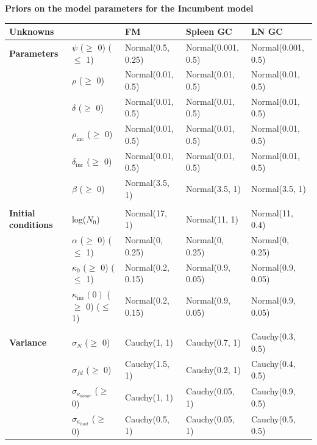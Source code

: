 \documentclass[11pt]{article}
\begin{document}
\begin{table}[h!]
	\begin{center}
		\textbf{Priors on the model parameters for the Incumbent model}\\
		\renewcommand{\arraystretch}{1.2}
		\begin{tabular}{l l l l l } 
			\toprule 
			\textbf{Unknowns}              &                                     & \textbf{FM}           & \textbf{Spleen GC}        &  \textbf{LN GC}        \\ 
			\toprule
			\textbf{Parameters}            &$\psi$ ($\ge$ 0) ($\le$ 1)           & Normal(0.5, 0.25)     & Normal(0.001, 0.5)   &  Normal(0.001, 0.5)   \\ 			                               
			&$\rho$ ($\ge$ 0)                     & Normal(0.01, 0.5)     & Normal(0.01, 0.5)    &  Normal(0.01, 0.5)    \\
			&$\delta$ ($\ge$ 0)                   & Normal(0.01, 0.5)     & Normal(0.01, 0.5)    &  Normal(0.01, 0.5)    \\
			&$\rho_{\text{inc}}$ ($\ge$ 0)                     & Normal(0.01, 0.5)     & Normal(0.01, 0.5)    &  Normal(0.01, 0.5)    \\
			&$\delta_{\text{inc}}$ ($\ge$ 0)                   & Normal(0.01, 0.5)     & Normal(0.01, 0.5)    &  Normal(0.01, 0.5)    \\
			&$\beta$ ($\ge$ 0)                     & Normal(3.5, 1)        & Normal(3.5, 1)       &  Normal(3.5, 1)       \\
			&&&&\\
			\textbf{Initial conditions}    &log($N_0$)                           & Normal(17, 1)         & Normal(11, 1)        &  Normal(11, 0.4)      \\			                               
			&$\alpha$ ($\ge$ 0) ($\le$ 1)           & Normal(0, 0.25)     & Normal(0, 0.25)   &  Normal(0, 0.25)   \\
			&$\kappa_0$ ($\ge$ 0) ($\le$ 1)       & Normal(0.2, 0.15)     & Normal(0.9, 0.05)    &  Normal(0.9, 0.05)    \\
			&$\kappa_\text{inc}(0)$ ($\ge$ 0) ($\le$ 1)       & Normal(0.2, 0.15)     & Normal(0.9, 0.05)    &  Normal(0.9, 0.05)    \\
			&&&&\\
			\textbf{Variance}              &$\sigma_N$ ($\ge$ 0)                 & Cauchy(1, 1)          & Cauchy(0.7, 1)       &  Cauchy(0.3, 0.5)     \\ 
			&$\sigma_{fd}$ ($\ge$ 0)              & Cauchy(1.5, 1)        & Cauchy(0.2, 1)       &  Cauchy(0.4, 0.5)     \\
			&$\sigma_{\kappa_{donor}}$ ($\ge$ 0)  & Cauchy(1, 1)          & Cauchy(0.05, 1)      &  Cauchy(0.9, 0.5)     \\ 
			&$\sigma_{\kappa_{host}}$ ($\ge$ 0)   & Cauchy(0.5, 1)        & Cauchy(0.05, 1)      &  Cauchy(0.5, 0.5)     \\
			\hline
			\toprule 
		\end{tabular}
	\end{center}
	\label{tab:priors_inc}
\end{table} 
\end{document}
